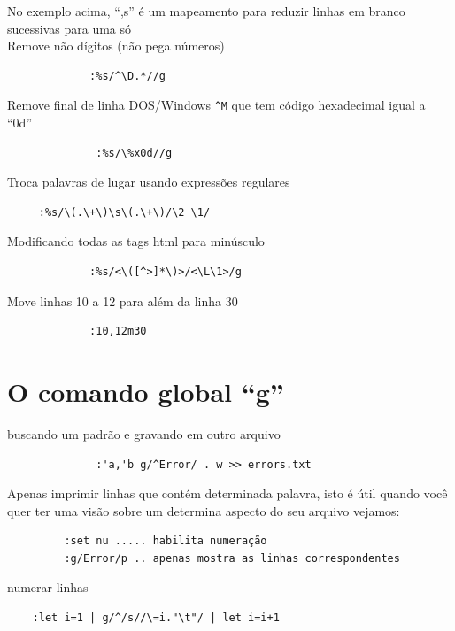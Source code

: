 \documentclass[10pt,a4paper,openany]{book}
\begin{document}
No exemplo acima, ``,s'' é um mapeamento para reduzir linhas em branco
sucessivas para uma só  \\


Remove não dígitos (não pega números)

\begin{verbatim}
			 :%s/^\D.*//g
\end{verbatim}

Remove final de linha DOS/Windows \verb|^M| que tem código hexadecimal igual a
``0d''

\begin{verbatim}
			  :%s/\%x0d//g
\end{verbatim}

Troca palavras de lugar usando expressões regulares

\begin{verbatim}
	 :%s/\(.\+\)\s\(.\+\)/\2 \1/
\end{verbatim}

Modificando todas as tags html para minúsculo

\begin{verbatim}
			 :%s/<\([^>]*\)>/<\L\1>/g
\end{verbatim}

Move linhas 10 a 12 para além da linha 30

\begin{verbatim}
			 :10,12m30
\end{verbatim}

\section{O comando global ``g''}\label{sec:O comando global ``g''}

buscando um padrão e gravando em outro arquivo

\begin{verbatim}
			  :'a,'b g/^Error/ . w >> errors.txt
\end{verbatim}

Apenas imprimir linhas que contém determinada palavra, isto é útil 
quando você quer ter uma visão sobre um determina aspecto 
do seu arquivo vejamos:

\begin{verbatim}
		 :set nu ..... habilita numeração 
		 :g/Error/p .. apenas mostra as linhas correspondentes
\end{verbatim}

numerar linhas

\begin{verbatim}
	:let i=1 | g/^/s//\=i."\t"/ | let i=i+1
\end{verbatim}
\end{document}
